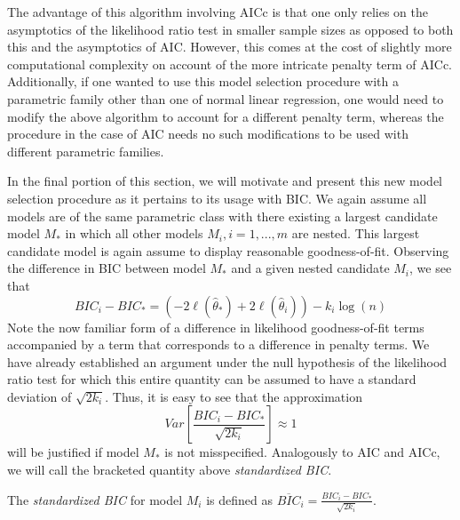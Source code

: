 		The advantage of this algorithm involving AICc is that one only relies on the asymptotics of the likelihood ratio test in smaller sample sizes as opposed
		to both this and the asymptotics of AIC. However, this comes at the cost of slightly more computational complexity on account of the more intricate
		penalty term of AICc. Additionally, if one wanted to use this model selection procedure with a parametric family other than one of normal linear regression,
		one would need to modify the above algorithm to account for a different penalty term, whereas the procedure in the case of AIC needs no such modifications
		to be used with different parametric families.

		In the final portion of this section, we will motivate and present this new model selection procedure as it pertains to its usage with BIC. We again assume
		all models are of the same parametric class with there existing a largest candidate model $M_*$ in which all other models $M_i, i = 1,...,m$ are nested.
		This largest candidate model is again assume to display reasonable goodness-of-fit. Observing the difference in BIC between model $M_*$ and a given
		nested candidate $M_i$, we see that
		\begin{equation}
			BIC_i - BIC_* = \left( -2 \ell (\hat{\theta}_*) + 2 \ell (\hat{\theta}_i) \right) - k_i \log(n)
		\end{equation}
		Note the now familiar form of a difference in likelihood goodness-of-fit terms accompanied by a term that corresponds to a difference in penalty terms.
		We have already established an argument under the null hypothesis of the likelihood ratio test for which this entire quantity can be assumed to have
		a standard deviation of $\sqrt{2k_i}$. Thus, it is easy to see that the approximation
		\begin{equation}
			Var \left[ \frac{BIC_i - BIC_*}{\sqrt{2k_i}} \right] \approx 1 
		\end{equation}
		will be justified if model $M_*$ is not misspecified. Analogously to AIC and AICc, we will call the bracketed quantity above \textit{standardized BIC}.
		\begin{definition}
			The \textit{standardized BIC} for model $M_i$ is defined as $\overline{BIC}_i = \frac{BIC_i - BIC_*}{\sqrt{2k_i}}$.
		\end{definition}

